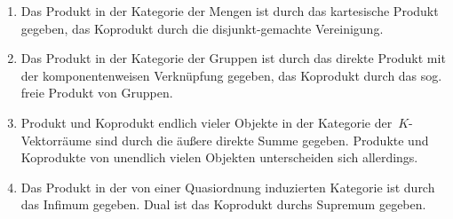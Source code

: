 \begin{bsp}\begin{enumerate}
\item Das Produkt in der Kategorie der Mengen ist durch das kartesische Produkt
gegeben, das Koprodukt durch die disjunkt-gemachte Vereinigung.
\item Das Produkt in der Kategorie der Gruppen ist durch das direkte Produkt
mit der komponentenweisen Verknüpfung gegeben, das Koprodukt durch das sog.
freie Produkt von Gruppen.
\item Produkt und Koprodukt endlich vieler Objekte in der Kategorie
der~$K$-Vektorräume sind durch die äußere direkte Summe gegeben. Produkte und
Koprodukte von unendlich vielen Objekten unterscheiden sich allerdings.
\item Das Produkt in der von einer Quasiordnung induzierten Kategorie ist durch
das Infimum gegeben. Dual ist das Koprodukt
durchs Supremum gegeben.
\end{enumerate}\end{bsp}
